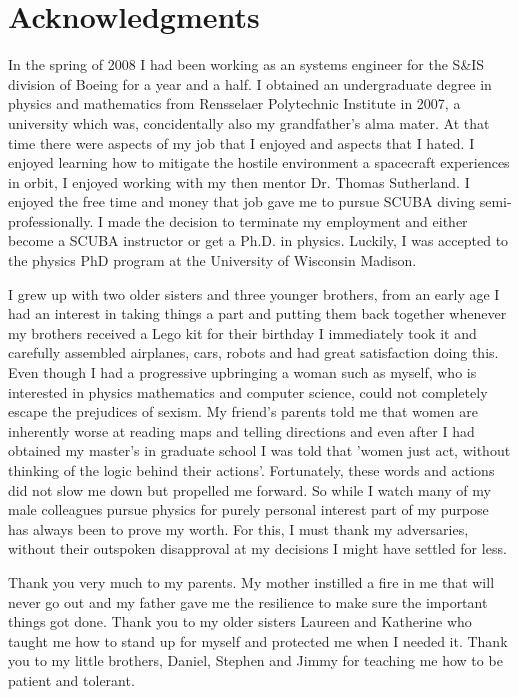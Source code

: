 \section{Acknowledgments}
In the spring of 2008 I had been working as an systems engineer for the S&IS division
of Boeing %
for a year and a half. I obtained an undergraduate degree in physics and mathematics 
from Rensselaer Polytechnic Institute in 2007, a university which was, concidentally also
my grandfather's alma mater. At that time there were aspects
of my job that I enjoyed and aspects that I hated. I enjoyed learning how to mitigate
the hostile environment a spacecraft experiences in orbit, I enjoyed working
with my then mentor Dr. Thomas Sutherland. I enjoyed the free time
and money that job gave me to pursue SCUBA diving semi-professionally. 
I made the decision
to terminate my employment and either become a SCUBA instructor or
get a Ph.D. in physics. Luckily, I was accepted to the physics PhD program at the University of Wisconsin
Madison. 

I grew up with two older sisters and three younger brothers, from an early age I had
an interest in taking things a part and putting them back together
whenever my brothers received a Lego kit for their birthday I
immediately took it and carefully assembled airplanes, cars, robots and had great
satisfaction doing this. Even though
I had a progressive upbringing a woman such as myself, who is interested in physics
mathematics and computer science, could not completely 
escape the prejudices of sexism. My friend's parents
told me that women are inherently worse at reading maps and telling 
directions and
even after I had obtained my master's in graduate school 
I was told that 'women just act, without thinking 
of the logic behind their actions'. Fortunately, these words and actions did not 
slow me down but propelled me forward. So while I watch many of my 
male colleagues pursue physics for purely personal interest part of my
purpose has always been to prove my worth. For this, I must thank my adversaries, 
without their outspoken disapproval at my decisions I might have 
settled for less. 

Thank you very much to my parents. My mother instilled a fire in me that will never 
go out and my father gave me the resilience to make sure the important things
got done. Thank you to my older sisters Laureen and Katherine who taught me how to stand up 
for myself and protected me when I needed it. Thank you to my little brothers, Daniel, Stephen
and Jimmy for teaching me how to be patient and tolerant.

